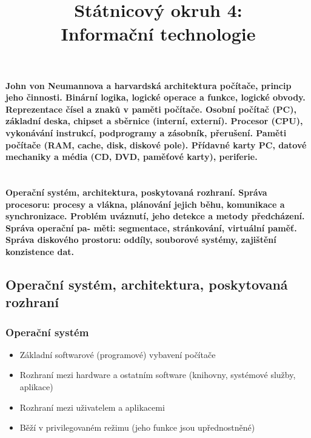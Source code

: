 \documentclass[10pt,a4paper]{article}
\begin{document}
\title{Státnicový okruh 4: \\ Informační technologie}
\maketitle
\newpage
\tableofcontents
\newpage

\section{}
\paragraph{John von Neumannova a harvardská architektura počítače, princip jeho činnosti. Binární logika, logické operace a funkce, logické obvody. Reprezentace čísel a znaků v paměti počítače. Osobní počítač (PC), základní deska, chipset a sběrnice (interní, externí). Procesor (CPU), vykonávání instrukcí, podprogramy a zásobník, přerušení. Paměti počítače (RAM, cache, disk, diskové pole). Přídavné karty PC, datové mechaniky a média (CD, DVD, paměťové karty), periferie.}



\newpage
\section{}
\paragraph{Operační systém, architektura, poskytovaná rozhraní. Správa procesoru: procesy a vlákna, plánování jejich
běhu, komunikace a synchronizace. Problém uváznutí, jeho detekce a metody předcházení. Správa operační pa-
měti: segmentace, stránkování, virtuální paměť. Správa diskového prostoru: oddíly, souborové systémy, zajištění
konzistence dat.}


\subsection{Operační systém, architektura, poskytovaná rozhraní}

\subsubsection{Operační systém}
\begin{itemize}
	\item Základní softwarové (programové) vybavení počítače
	\item Rozhraní mezi hardware a ostatním software (knihovny, systémové služby, aplikace)
	\item Rozhraní mezi uživatelem a aplikacemi
	\item Běží v privilegovaném režimu (jeho funkce jsou upřednostněné)
\end{itemize}
\end{document}
